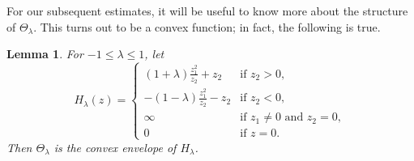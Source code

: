 \documentclass[a4paper]{article}
\newtheorem{lemma}[theorem]{Lemma}
\theoremstyle{definition}
\theoremstyle{remark}
\begin{document}
For our subsequent estimates, it will be useful to know more about the structure of
$\Theta_\lambda$. This turns out to be a convex function; in fact, the following is true.

\begin{lemma} \label{lem:convex-envelope}
For $-1 \le \lambda \le 1$, let
\[
H_\lambda(z) = \begin{cases}
(1 + \lambda) \frac{z_1^2}{z_2} + z_2 & \text{if $z_2 > 0$}, \\
-(1 - \lambda) \frac{z_1^2}{z_2} - z_2 & \text{if $z_2 < 0$}, \\
\infty & \text{if $z_1 \neq 0$ and $z_2 = 0$}, \\
0 & \text{if $z = 0$}.
\end{cases}
\]
Then $\Theta_\lambda$ is the convex envelope of $H_\lambda$.
\end{lemma}
\end{document}
